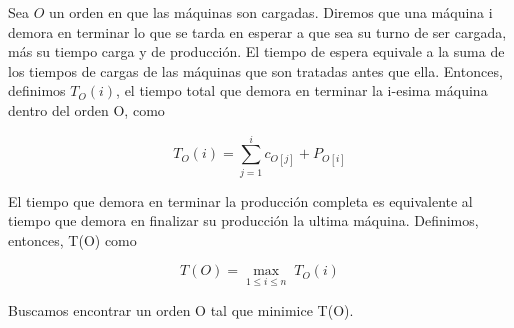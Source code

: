  
Sea $O$ un orden en que las m\'aquinas son cargadas.
Diremos que una m\'aquina i demora en terminar lo que se tarda en esperar a que sea su turno de ser cargada, m\'as su tiempo carga y de producci\'on.
El tiempo de espera equivale a la suma de los tiempos de cargas de las m\'aquinas que son tratadas antes que ella. 
Entonces, definimos $T_{O}(i)$, el tiempo total que demora en terminar la i-esima m\'aquina dentro del orden O, como 
 
$$ T_{O}(i) = \sum_{j = 1}^{i}{c_{O[j]}} + P_{O[i]}$$
 
El tiempo que demora en terminar la producci\'on completa es equivalente al tiempo que demora en finalizar su producci\'on la ultima m\'aquina. Definimos, entonces, T(O) como

$$T(O) = {\displaystyle\max_{1 \leq i \leq n}\;  T_{O}(i)}$$

Buscamos encontrar un orden O tal que minimice T(O).


